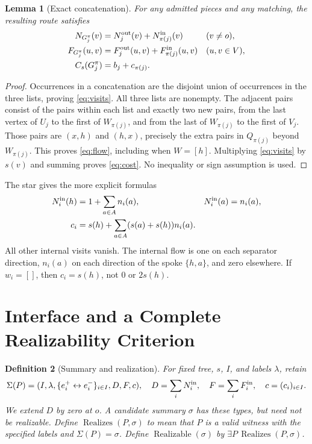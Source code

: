 \documentclass[11pt]{article}
\newtheorem{definition}{Definition}[section]
\newtheorem{lemma}[definition]{Lemma}
\theoremstyle{remark}
\newcommand{\Real}{\operatorname{Realizes}}
\begin{document}
\begin{lemma}[Exact concatenation]\label{lem:additive}
For any admitted pieces and any matching, the resulting route satisfies
\begin{align}
 N_{G_j^\pi}(v)&=N_j^{\rm out}(v)+N_{\pi(j)}^{\rm in}(v)
 &&(v\ne o),\label{eq:visits}\\
 F_{G_j^\pi}(u,v)&=F_j^{\rm out}(u,v)+F_{\pi(j)}^{\rm in}(u,v)
 &&(u,v\in V),\label{eq:flow}\\
 C_s(G_j^\pi)&=b_j+c_{\pi(j)}.\label{eq:cost}
\end{align}
\end{lemma}
\begin{proof}
Occurrences in a concatenation are the disjoint union of occurrences in the
three lists, proving \eqref{eq:visits}. All three lists are nonempty.
The adjacent pairs consist of the pairs within each list and exactly two
new pairs, from the last vertex of $U_j$ to the first of $W_{\pi(j)}$,
and from the last of $W_{\pi(j)}$ to the first of $V_j$.
Those pairs are $(x,h)$ and $(h,x)$, precisely the extra pairs in $Q_{\pi(j)}$
beyond $W_{\pi(j)}$. This proves \eqref{eq:flow}, including when $W=[h]$.
Multiplying \eqref{eq:visits} by $s(v)$ and summing proves \eqref{eq:cost}.
No inequality or sign assumption is used.
\end{proof}

The star gives the more explicit formulas
\begin{align}
 N_i^{\rm in}(h)&=1+\sum_{a\in A}n_i(a),&
 N_i^{\rm in}(a)&=n_i(a),\label{eq:starvisits}\\
 c_i&=s(h)+\sum_{a\in A}(s(a)+s(h))n_i(a).\label{eq:starcost}
\end{align}
All other internal visits vanish. The internal flow is one on each separator
direction, $n_i(a)$ on each direction of the spoke $\{h,a\}$, and zero
elsewhere. If $w_i=[]$, then $c_i=s(h)$, not $0$ or $2s(h)$.

\section{Interface and a Complete Realizability Criterion}
\label{sec:realization}

\begin{definition}[Summary and realization]
For fixed tree, $s$, $I$, and labels $\lambda$, retain
\[
 \Sigma(P)=(I,\lambda,\{e_i^+\leftrightarrow e_i^-\}_{i\in I},D,F,c),
 \quad D=\sum_i N_i^{\rm in},\quad F=\sum_i F_i^{\rm in},\quad c=(c_i)_{i\in I}.
\]
We extend $D$ by zero at $o$. A candidate summary $\sigma$ has these types,
but need not be realizable. Define $\Real(P,\sigma)$ to mean that $P$ is a
valid witness with the specified labels and $\Sigma(P)=\sigma$.
Define $\operatorname{Realizable}(\sigma)$ by $\exists P\,\Real(P,\sigma)$.
\end{definition}
\end{document}
